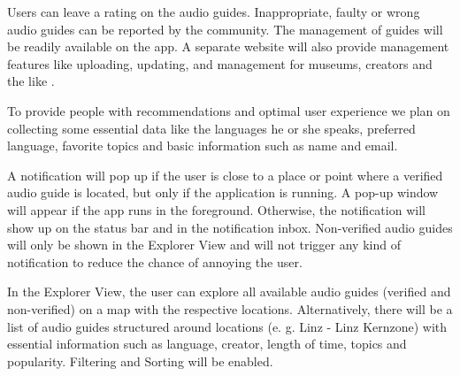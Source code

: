 \documentclass[12pt]{article}
\theoremstyle{definition}
\newenvironment{text}{
}{}
\begin{document}
\begin{text}
Users can leave a rating on the audio guides. Inappropriate, faulty or wrong audio guides can be reported by the community. The management of guides will be readily available on the app. A separate website will also provide management features like uploading, updating, and management for museums, creators and the like .\newline

To provide people with recommendations and optimal user experience we plan on collecting some essential data like the languages he or she speaks, preferred language, favorite topics and basic information such as name and email.\newline
 
A notification will pop up if the user is close to a place or point where a verified audio guide is located, but only if the application is running. A pop-up window will appear if the app runs in the foreground. Otherwise, the notification will show up on the status bar and in the notification inbox. 
Non-verified audio guides will only be shown in the Explorer View and will not trigger any kind of notification to reduce the chance of annoying the user.\newline
 
In the Explorer View, the user can explore all available audio guides (verified and non-verified) on a map with the respective locations. Alternatively, there will be a list of audio guides structured around locations (e. g. Linz - Linz Kernzone) with essential information such as language, creator, length of time, topics and popularity. Filtering and Sorting will be enabled.
\end{text}
\end{document}
